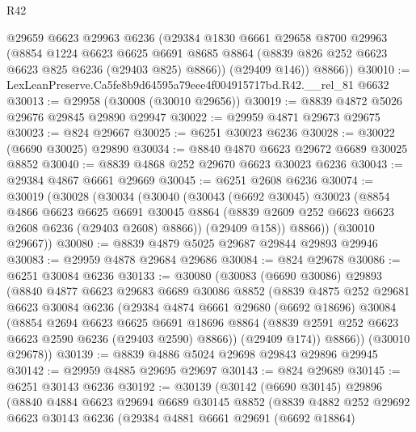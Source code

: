 \begin{lexlean}{R42}
\begin{coremodule}
{        @29659
        @6623
        @29963
        @6236
        (@29384
          @1830
          @6661
          @29658
          @8700
          @29963
          (@8854
            @1224
            @6623
            @6625
            @6691
            @8685
            @8864
            (@8839 @826 @252 @6623 @6623 @825 @6236 (@29403 @825) @8866))
          (@29409 @146))
        @8866))
@30010 := LexLeanPreserve.Ca5fe8b9d64595a79eee4f004915717bd.R42.__rel_81 @6632
@30013 := @29958 (@30008 (@30010 @29656))
@30019 := @8839 @4872 @5026 @29676 @29845 @29890 @29947
@30022 := @29959 @4871 @29673 @29675
@30023 := @824 @29667
@30025 := @6251 @30023 @6236
@30028 := @30022 (@6690 @30025) @29890
@30034 := @8840 @4870 @6623 @29672 @6689 @30025 @8852
@30040 := @8839 @4868 @252 @29670 @6623 @30023 @6236
@30043 := @29384 @4867 @6661 @29669
@30045 := @6251 @2608 @6236
@30074 := @30019
    (@30028
      (@30034
        (@30040
          (@30043
            (@6692 @30045)
            @30023
            (@8854
              @4866
              @6623
              @6625
              @6691
              @30045
              @8864
              (@8839 @2609 @252 @6623 @6623 @2608 @6236 (@29403 @2608) @8866))
            (@29409 @158))
          @8866))
      (@30010 @29667))
@30080 := @8839 @4879 @5025 @29687 @29844 @29893 @29946
@30083 := @29959 @4878 @29684 @29686
@30084 := @824 @29678
@30086 := @6251 @30084 @6236
@30133 := @30080
    (@30083
      (@6690 @30086)
      @29893
      (@8840
        @4877
        @6623
        @29683
        @6689
        @30086
        @8852
        (@8839
          @4875
          @252
          @29681
          @6623
          @30084
          @6236
          (@29384
            @4874
            @6661
            @29680
            (@6692 @18696)
            @30084
            (@8854
              @2694
              @6623
              @6625
              @6691
              @18696
              @8864
              (@8839 @2591 @252 @6623 @6623 @2590 @6236 (@29403 @2590) @8866))
            (@29409 @174))
          @8866))
      (@30010 @29678))
@30139 := @8839 @4886 @5024 @29698 @29843 @29896 @29945
@30142 := @29959 @4885 @29695 @29697
@30143 := @824 @29689
@30145 := @6251 @30143 @6236
@30192 := @30139
    (@30142
      (@6690 @30145)
      @29896
      (@8840
        @4884
        @6623
        @29694
        @6689
        @30145
        @8852
        (@8839
          @4882
          @252
          @29692
          @6623
          @30143
          @6236
          (@29384
            @4881
            @6661
            @29691
            (@6692 @18864)
}
\end{coremodule}
\end{lexlean}
